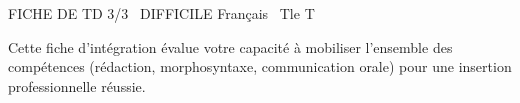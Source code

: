 \documentclass[11pt]{article}
\begin{document}
\begin{tcolorbox}[enhanced,colback=popink,colframe=popink,arc=10pt,boxrule=0pt,left=12pt,right=12pt,top=9pt,bottom=9pt]
{\color{white}\popxbold\small FICHE DE TD 3/3 \textbullet\ DIFFICILE \hfill Français \textbullet\ Tle T\par}
\end{tcolorbox}
\vspace{4pt}
Cette fiche d'intégration évalue votre capacité à mobiliser l'ensemble des compétences (rédaction, morphosyntaxe, communication orale) pour une insertion professionnelle réussie.
\end{document}
